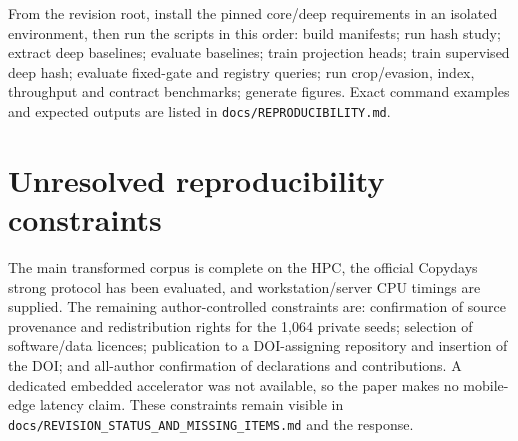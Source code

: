 \documentclass[11pt]{article}
\begin{document}
From the revision root, install the pinned core/deep requirements in an isolated environment, then run the scripts in this order: build manifests; run hash study; extract deep baselines; evaluate baselines; train projection heads; train supervised deep hash; evaluate fixed-gate and registry queries; run crop/evasion, index, throughput and contract benchmarks; generate figures. Exact command examples and expected outputs are listed in \texttt{docs/REPRODUCIBILITY.md}.

\section{Unresolved reproducibility constraints}

The main transformed corpus is complete on the HPC, the official Copydays strong protocol has been evaluated, and workstation/server CPU timings are supplied. The remaining author-controlled constraints are: confirmation of source provenance and redistribution rights for the 1,064 private seeds; selection of software/data licences; publication to a DOI-assigning repository and insertion of the DOI; and all-author confirmation of declarations and contributions. A dedicated embedded accelerator was not available, so the paper makes no mobile-edge latency claim. These constraints remain visible in \texttt{docs/REVISION\_STATUS\_AND\_MISSING\_ITEMS.md} and the response.
\end{document}
